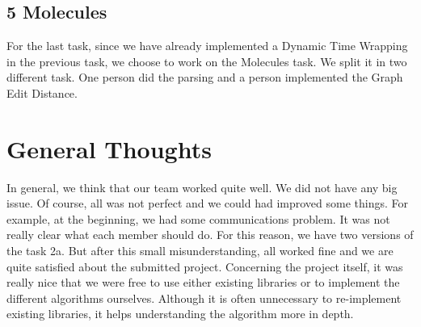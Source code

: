 \documentclass[12pt]{article}
\begin{document}
\subsection*{5 Molecules}
For the last task, since we have already implemented a Dynamic Time Wrapping in the previous task, we choose to work on the Molecules task. We split it in two different task. One person did the parsing and a person implemented the Graph Edit Distance. 

\section*{General Thoughts}
In general, we think that our team worked quite well. We did not have any big issue. Of course, all was not perfect and we could had improved some things. For example, at the beginning, we had some communications problem. It was not really clear what each member should do. For this reason, we have two versions of the task 2a. But after this small misunderstanding, all worked fine and we are quite satisfied about the submitted project.
\newline Concerning the project itself, it was really nice that we were free to use either existing libraries or to implement the different algorithms ourselves. Although it is often unnecessary to re-implement existing libraries, it helps understanding the algorithm more in depth.
\end{document}

